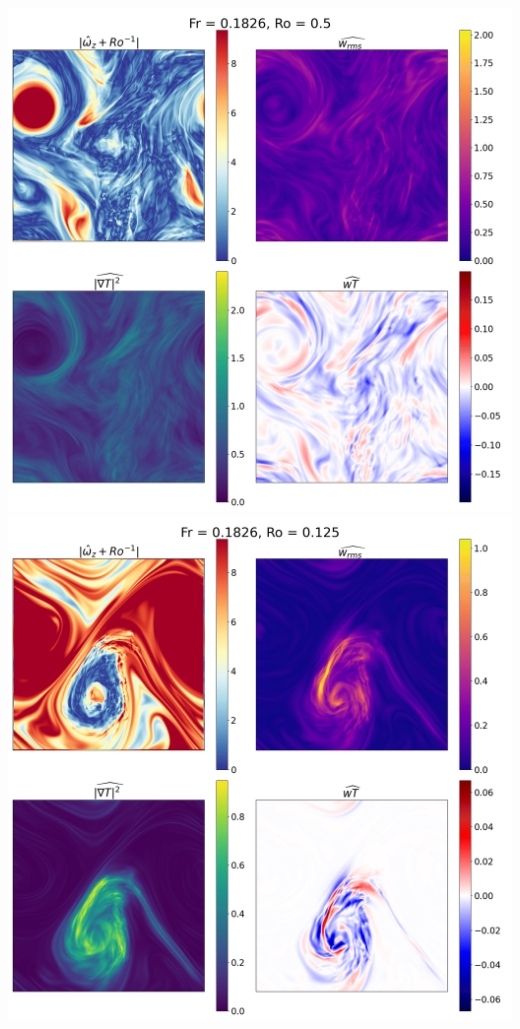\documentclass[30pt, blockverticalspace=1cm]{tikzposter}
\begin{document}
\begin{columns}
{\begin{center}
        \centering
        \includegraphics[width=.95\linewidth]{images/Om2B30Re600Pe60_vert_avg.png}
    \emp
        \centering
        \includegraphics[width=.95\linewidth]{images/Om8B30Re600Pe60_vert_avg.png}
    \emp
    \end{center}
}



\end{columns}
\end{document}
